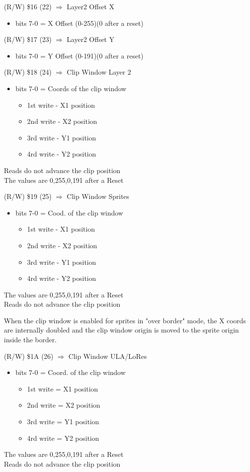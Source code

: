 (R/W) \$16 (22) $\Rightarrow$ Layer2 Offset X
\begin{itemize}
\item[] bits 7-0 = X Offset (0-255)(0 after a reset)
\end{itemize}

(R/W) \$17 (23) $\Rightarrow$ Layer2 Offset Y
\begin{itemize}
\item[] bits 7-0 = Y Offset (0-191)(0 after a reset)
\end{itemize}

(R/W) \$18 (24) $\Rightarrow$ Clip Window Layer 2
\begin{itemize}
\item[] bits 7-0 = Coords of the clip window
  \begin{itemize}
  \item[] 1st write - X1 position
  \item[] 2nd write - X2 position
  \item[] 3rd write - Y1 position
  \item[] 4rd write - Y2 position
  \end{itemize}
\end{itemize}
Reads do not advance the clip position\\
The values are 0,255,0,191 after a Reset

(R/W) \$19 (25) $\Rightarrow$ Clip Window Sprites
\begin{itemize}
\item[] bits 7-0 = Cood. of the clip window
  \begin{itemize}
  \item[] 1st write - X1 position
  \item[] 2nd write - X2 position
  \item[] 3rd write - Y1 position
  \item[] 4rd write - Y2 position
  \end{itemize}
\end{itemize}
The values are 0,255,0,191 after a Reset\\
Reads do not advance the clip position

When the clip window is enabled for sprites in "over border" mode, the
X coords are internally doubled and the clip window origin is moved to
the sprite origin inside the border.

(R/W) \$1A (26) $\Rightarrow$ Clip Window ULA/LoRes
\begin{itemize}
\item[] bits 7-0 = Coord. of the clip window
  \begin{itemize}
  \item[] 1st write = X1 position
  \item[] 2nd write = X2 position
  \item[] 3rd write = Y1 position
  \item[] 4rd write = Y2 position
  \end{itemize}
\end{itemize}
The values are 0,255,0,191 after a Reset\\
Reads do not advance the clip position

